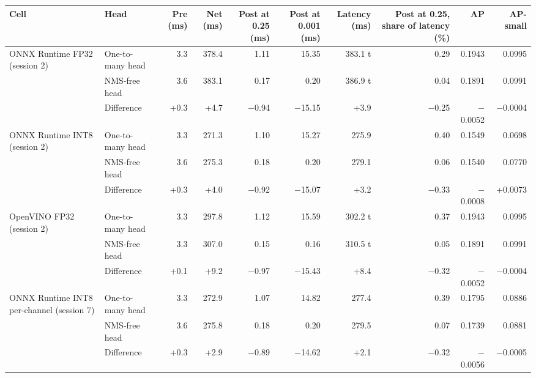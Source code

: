\begin{tabular}{llrrrrrrrr}
\toprule
Cell & Head & Pre (ms) & Net (ms) & Post at 0.25 (ms) & Post at 0.001 (ms) & Latency (ms) & Post at 0.25, share of latency (\%) & AP & AP-small \\
\midrule
ONNX Runtime FP32 (session 2) & One-to-many head & 3.3 & 378.4 & 1.11 & 15.35 & 383.1 t & 0.29 & 0.1943 & 0.0995 \\
 & NMS-free head & 3.6 & 383.1 & 0.17 & 0.20 & 386.9 t & 0.04 & 0.1891 & 0.0991 \\
 & Difference & +0.3 & +4.7 & $-$0.94 & $-$15.15 & +3.9 & $-$0.25 & $-$0.0052 & $-$0.0004 \\
\midrule
ONNX Runtime INT8 (session 2) & One-to-many head & 3.3 & 271.3 & 1.10 & 15.27 & 275.9 & 0.40 & 0.1549 & 0.0698 \\
 & NMS-free head & 3.6 & 275.3 & 0.18 & 0.20 & 279.1 & 0.06 & 0.1540 & 0.0770 \\
 & Difference & +0.3 & +4.0 & $-$0.92 & $-$15.07 & +3.2 & $-$0.33 & $-$0.0008 & +0.0073 \\
\midrule
OpenVINO FP32 (session 2) & One-to-many head & 3.3 & 297.8 & 1.12 & 15.59 & 302.2 t & 0.37 & 0.1943 & 0.0995 \\
 & NMS-free head & 3.3 & 307.0 & 0.15 & 0.16 & 310.5 t & 0.05 & 0.1891 & 0.0991 \\
 & Difference & +0.1 & +9.2 & $-$0.97 & $-$15.43 & +8.4 & $-$0.32 & $-$0.0052 & $-$0.0004 \\
\midrule
ONNX Runtime INT8 per-channel (session 7) & One-to-many head & 3.3 & 272.9 & 1.07 & 14.82 & 277.4 & 0.39 & 0.1795 & 0.0886 \\
 & NMS-free head & 3.6 & 275.8 & 0.18 & 0.20 & 279.5 & 0.07 & 0.1739 & 0.0881 \\
 & Difference & +0.3 & +2.9 & $-$0.89 & $-$14.62 & +2.1 & $-$0.32 & $-$0.0056 & $-$0.0005 \\
\bottomrule
\end{tabular}
